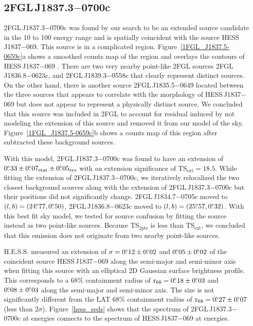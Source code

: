 \documentclass[12pt,preprint]{aastex}
\newcommand{\gev}{\text{GeV}\xspace}
\newcommand{\tev}{\text{TeV}\xspace}
\newcommand{\tsext}{{\ensuremath{\text{TS}_{\text{ext}}}}\xspace}
\newcommand{\tsinc}{\ensuremath{\text{TS}_{\text{2pts}}}\xspace}
\newcommand{\rsixeight}{{\ensuremath{\text{r}_{68}}}\xspace}
\newcommand{\sys}{\text{sys}\xspace}
\newcommand{\stat}{\text{stat}\xspace}
\begin{document}
\subsection{2FGL\,J1837.3$-$0700c}
\label{section_2FGL_J1837.3-0700c}



2FGL\,J1837.3$-$0700c was found by our search to be an extended source
candidate in the 10 \gev to 100 \gev energy range and is spatially
coincident with the \tev source HESS\,J1837$-$069.  This source is
in a complicated region.  Figure~\ref{1FGL_J1837.5-0659c}a shows a
smoothed counts map of the region and overlays the \tev contours of
HESS\,J1837$-$069 \citep{hess_plane_survey}.  There are two very nearby
point-like 2FGL sources 2FGL\,J1836.8$-$0623c, and 2FGL\,J1839.3$-$0558c
that clearly represent distinct sources.  On the other hand, there is
another source 2FGL\,J1835.5$-$0649 located between the three sources that
appears to correlate with the \tev morphology of HESS\,J1837$-$069 but
does not appear to represent a physically distinct source.  We concluded
that this source was included in 2FGL to account for residual induced by
not modeling the extension of this source and removed it from our model
of the sky.  Figure~\ref{1FGL_J1837.5-0659c}b shows a
counts map of this region after subtracted these background sources.

With this model, 2FGL\,J1837.3$-$0700c was found to have an
extension of $0\fdg33\pm0\fdg07_\stat\pm0\fdg05_\sys$ with an extension
significance of $\tsext=18.5$. 
While fitting the extension of 2FGL\,J1837.3$-$0700c,
we iteratively relocalized the two closest
background sources along with the extension of 2FGL\,J1837.3$-$0700c but
their positions did not significantly change.  2FGL\,J1834.7$-$0705c
moved to $(l,b)=(24\mbox{$.\!\!^\circ$}77,0\mbox{$.\!\!^\circ$}50)$, 2FGL\,J1836.8$-$0623c moved
to $(l,b)=(25\mbox{$.\!\!^\circ$}57,0\mbox{$.\!\!^\circ$}32)$. With this best fit sky model, we tested for
source confusion by fitting the source instead as two point-like sources.
Because \tsinc is less than \tsext, we concluded that this emission
does not originate from two nearby point-like sources.

H.E.S.S. measured an extension of
$\sigma=0\mbox{$.\!\!^\circ$}12\pm0\mbox{$.\!\!^\circ$}02$ and $0\mbox{$.\!\!^\circ$}05\pm0\mbox{$.\!\!^\circ$}02$ 
of the coincident \tev source HESS\,J1837$-$069 
along the semi-major and semi-minor axis when fitting this source
with an elliptical 2D Gaussian surface brightness profile.  This corresponds
to a 68\% containment radius of $\rsixeight=0\fdg18\pm0\fdg03$ and
$0\mbox{$.\!\!^\circ$}08\pm0\mbox{$.\!\!^\circ$}03$ along the semi-major and semi-minor axis. The
size is not significantly different from the LAT 68\% containment
radius of $\rsixeight=0\fdg27\pm0\fdg07$ (less than $2\sigma$).
Figure~\ref{hess_seds} shows that the spectrum of 2FGL\,J1837.3$-$0700c
at \gev energies connects to the spectrum of HESS\,J1837$-$069 at \tev
energies.
\end{document}
